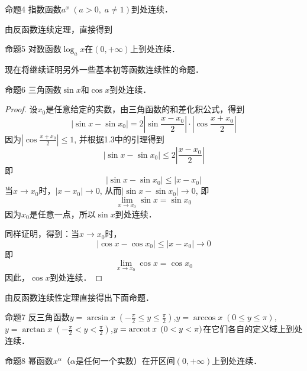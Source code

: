 \begin{blk}
    {命题4} 指数函数$a^x\; (a>0,\; a\ne 1)$到处连续．
\end{blk}

由反函数连续定理，直接得到

\begin{blk}
    {命题5} 对数函数$\log_a x$在$(0,+\infty)$上到处连续．
\end{blk}

现在将继续证明另外一些基本初等函数连续性的命题．

\begin{blk}
    {命题6} 三角函数$\sin x$和$\cos x$到处连续．
\end{blk}

\begin{proof}
设$x_0$是任意给定的实数，由三角函数的和差化积公式，得到
\[|\sin x-\sin x_0|=2\left|\sin\frac{x-x_0}{2}\right| \cdot \left|\cos \frac{x+x_0}{2}\right|\]
因为$\left|\cos\frac{x+x_0}{2}\right|\le 1$, 并根据1.3中的引理得到
\[|\sin x-\sin x_0|\le 2\left|\frac{x-x_0}{2}\right|\]
即
\[|\sin x-\sin x_0|\le \left|x-x_0\right|\]
当$x\to x_0$时，$|x-x_0|\to 0$, 从而$|\sin x-\sin x_0|\to 0$, 即
\[\lim_{x\to x_0} \sin x=\sin x_0\]
因为$x_0$是任意一点，所以$\sin x$到处连续．

同样证明，得到：当$x\to x_0$时，
\[|\cos x-\cos x_0|\le |x-x_0|\to 0\]
即
\[\lim_{x\to x_0} \cos x=\cos x_0\]
因此，$\cos x$到处连续．
\end{proof}
 
由反函数连续性定理直接得出下面命题．

\begin{blk}
    {命题7} 反三角函数$y=\arcsin x\; \left(-\frac{\pi}{2}\le y\le \frac{\pi}{2}\right)$,\quad $y=\arccos x\; \left(0\le y\le \pi\right)$,\quad $y=\arctan x\; \left(-\frac{\pi}{2}< y< \frac{\pi}{2}\right)$,\quad $y=\operatorname{arccot} x\; \left(0<y<\pi\right)$在它们各自的定义域上到处连续．
\end{blk}

\begin{blk}{命题8}
幂函数$x^{\alpha}$（$\alpha$是任何一个实数）在开区间$(0,+\infty)$上到处连续．
\end{blk}

